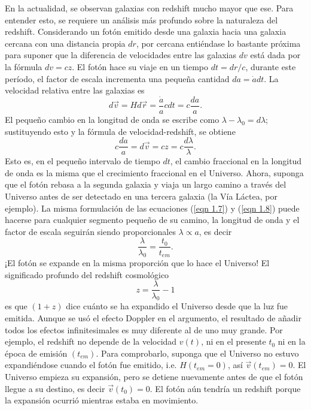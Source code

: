 \documentclass[a4paper,openright,12pt]{book}
\begin{document}
En la actualidad, se observan galaxias con redshift mucho mayor que ese. Para entender esto, se requiere un análisis más profundo sobre la naturaleza del redshift. Considerando un fotón emitido desde una galaxia hacia una galaxia cercana con una distancia propia $dr$, por cercana entiéndase lo bastante próxima para suponer que la diferencia de velocidades entre las galaxias $dv$ está dada por la fórmula $dv = cz$. El fotón hace su viaje en un tiempo $dt = dr/c$, durante este período, el factor de escala incrementa una pequeña cantidad $da = \dot{a} dt$. La velocidad relativa entre las galaxias es
\begin{equation}
d\vec{v}=Hd\vec{r}=\frac{\dot{a}}{a}cdt=c\frac{da}{a}.\label{eqn 1.7}
\end{equation}
El pequeño cambio en la longitud de onda se escribe como $ \lambda - \lambda_{0} = d\lambda$; sustituyendo esto y la fórmula de velocidad-redshift, se obtiene
\begin{equation}
c\frac{da}{a}=d\vec{v}=cz=c\frac{d\lambda}{\lambda}.\label{eqn 1.8}
\end{equation}
Esto es, en el pequeño intervalo de tiempo $dt$, el cambio fraccional en la longitud de onda es la misma que el crecimiento fraccional en el Universo. Ahora, suponga que el fotón rebasa a la segunda galaxia y viaja un largo camino a través del Universo antes de ser detectado en una tercera galaxia (la Vía Láctea, por ejemplo). La misma formulación de las ecuaciones (\ref{eqn 1.7}) y (\ref{eqn 1.8}) puede hacerse para cualquier segmento pequeño de su camino, la longitud de onda y el factor de escala seguirán siendo proporcionales $\lambda \propto a$, es decir
\begin{equation}
\frac{\lambda}{\lambda_{0}}= \frac{t_{0}}{t_{em}}.\label{eqn 1.9}
\end{equation}
¡El fotón se expande en la misma proporción que lo hace el Universo! El significado profundo del redshift cosmológico
\begin{equation}
z = \frac{\lambda}{\lambda_{0}} - 1\label{eqn 1.10}
\end{equation} 
es que $(1+z)$ dice cuánto se ha expandido el Universo desde que la luz fue emitida. Aunque se usó el efecto Doppler en el argumento, el resultado de añadir todos los efectos infinitesimales es muy diferente al de uno muy grande. Por ejemplo, el redshift no depende de la velocidad $v(t)$, ni en el presente $t_{0}$ ni en la época de emisión $(t_{em})$. Para comprobarlo, suponga que el Universo no estuvo expandiéndose cuando el fotón fue emitido, i.e. $H(t_{em}=0)$, así $\vec{v}(t_{em})=0$. El Universo empieza su expansión, pero se detiene nuevamente antes de que el fotón llegue a su destino, es decir $\vec{v}(t_{0})=0$. El fotón aún tendría un redshift porque la expansión ocurrió mientras estaba en movimiento.
\end{document}
